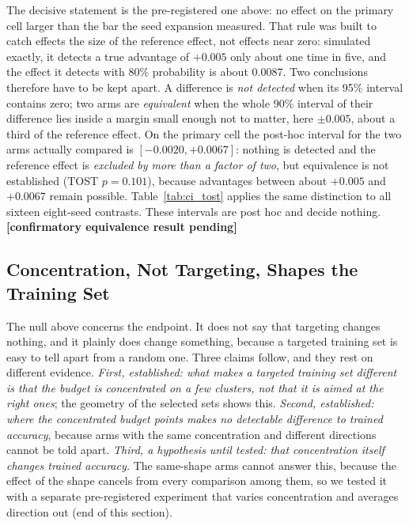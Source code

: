 \documentclass{article}
\newcommand{\eqverdict}{\textbf{[confirmatory equivalence result pending]}}
\begin{document}
The decisive statement is the pre-registered one above: no effect on the primary cell larger than the bar the seed expansion
measured. That rule was built to catch effects the size of the reference effect, not effects near zero: simulated
exactly, it detects a true advantage of $+0.005$ only about one time in five, and the effect it detects with 80\%
probability is about $0.0087$. Two conclusions therefore have to be kept apart. A difference is \emph{not detected}
when its 95\% interval contains zero; two arms are \emph{equivalent} when the whole 90\% interval of their difference
lies inside a margin small enough not to matter, here $\pm 0.005$, about a third of the reference effect. On the
primary cell the post-hoc interval for the two arms actually compared is $[-0.0020, +0.0067]$: nothing is detected
and the reference effect is \textit{excluded by more than a factor of two}, but equivalence is not established
(TOST $p = 0.101$), because advantages between about $+0.005$ and $+0.0067$ remain possible.
Table~\ref{tab:ci_tost} applies the same distinction to all sixteen eight-seed contrasts. These intervals are post hoc
and decide nothing. \eqverdict



\subsection{Concentration, Not Targeting, Shapes the Training Set}
\label{sec:concentration}
The null above concerns the endpoint. It does not say that targeting changes nothing, and it plainly does change
something, because a targeted training set is easy to tell apart from a random one. Three claims follow, and they rest
on different evidence. \textit{First, established: what makes a targeted training set different is that the budget is
concentrated on a few clusters, not that it is aimed at the right ones}; the geometry of the selected sets shows this.
\textit{Second, established: where the concentrated budget points makes no detectable difference to trained accuracy},
because arms with the same concentration and different directions cannot be told apart. \textit{Third, a hypothesis
until tested: that concentration itself changes trained accuracy.} The same-shape arms cannot answer this, because the
effect of the shape cancels from every comparison among them, so we tested it with a separate pre-registered experiment
that varies concentration and averages direction out (end of this section).
\end{document}
